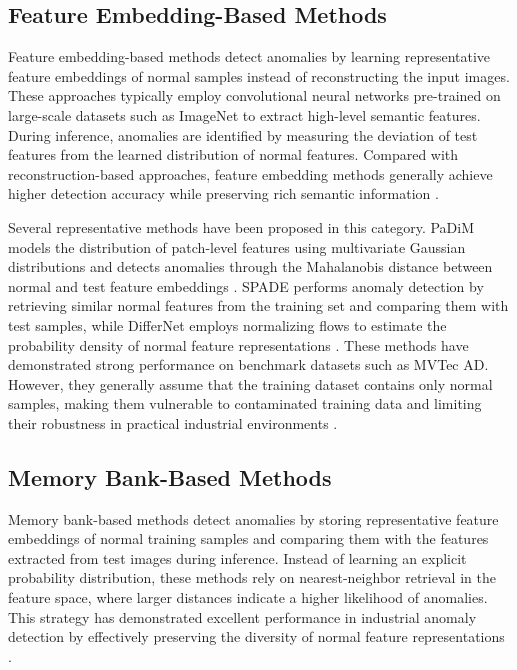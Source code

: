 \documentclass[12pt,openany,oneside]{book}
\begin{document}
\subsection{Feature Embedding-Based Methods}
Feature embedding-based methods detect anomalies by learning representative feature embeddings of normal samples instead of reconstructing the input images. These approaches typically employ convolutional neural networks pre-trained on large-scale datasets such as ImageNet to extract high-level semantic features. During inference, anomalies are identified by measuring the deviation of test features from the learned distribution of normal features. Compared with reconstruction-based approaches, feature embedding methods generally achieve higher detection accuracy while preserving rich semantic information \cite{liu2024survey}.

Several representative methods have been proposed in this category. PaDiM models the distribution of patch-level features using multivariate Gaussian distributions and detects anomalies through the Mahalanobis distance between normal and test feature embeddings \cite{defard2021padim}. SPADE performs anomaly detection by retrieving similar normal features from the training set and comparing them with test samples, while DifferNet employs normalizing flows to estimate the probability density of normal feature representations \cite{rudolph2021differnet}. These methods have demonstrated strong performance on benchmark datasets such as MVTec AD. However, they generally assume that the training dataset contains only normal samples, making them vulnerable to contaminated training data and limiting their robustness in practical industrial environments \cite{aqeel2025comet}.

\subsection{Memory Bank-Based Methods}

Memory bank-based methods detect anomalies by storing representative feature embeddings of normal training samples and comparing them with the features extracted from test images during inference. Instead of learning an explicit probability distribution, these methods rely on nearest-neighbor retrieval in the feature space, where larger distances indicate a higher likelihood of anomalies. This strategy has demonstrated excellent performance in industrial anomaly detection by effectively preserving the diversity of normal feature representations \cite{roth2022patchcore,liu2024survey}.
\end{document}

